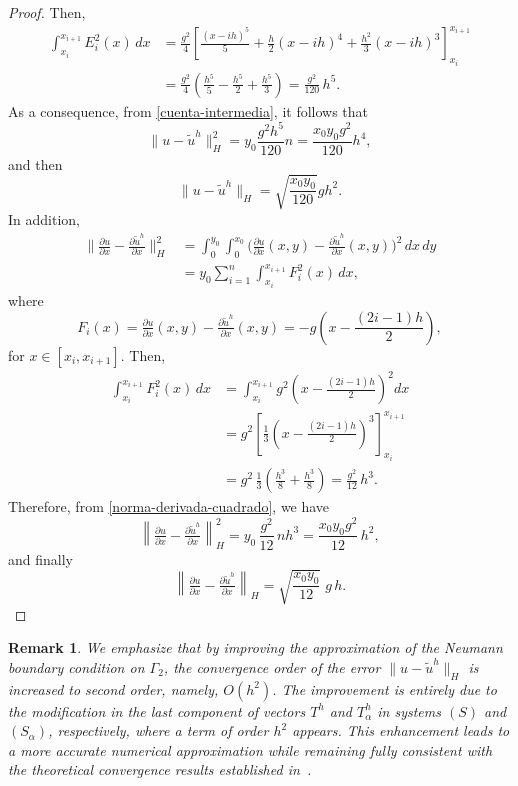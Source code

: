 \documentclass[11pt]{article}
\newcommand{\dee}{d}
\newcommand\pder[2][]{\ensuremath{\tfrac{\partial#1}{\partial#2}}}
\newtheorem{Remark}{Remark}
\begin{document}
\begin{proof}
Then,
\begin{equation}\label{integralEi}
\begin{aligned}
\int_{x_i}^{x_{i+1}} E_i^2(x)\,\dee x
&= \frac{g^2}{4}
\left[
\frac{(x-i h)^5}{5}
+ \frac{h}{2}(x-i h)^4
+ \frac{h^2}{3}(x-i h)^3
\right]_{x_i}^{x_{i+1}} \\[0.8ex]
&= \frac{g^2}{4}
\left(
\frac{h^5}{5}
- \frac{h^5}{2}
+ \frac{h^5}{3}
\right)
= \frac{g^2}{120}\,h^5 .
\end{aligned}
\end{equation}
As a consequence, from \eqref{cuenta-intermedia}, it follows that
$$\|u-{\widetilde{u}^h}\|_{H}^2=y_0 \frac{g^2 h^5}{120} n= \frac{x_0 y_0 g^2}{120} h^4,$$
and then
$$\|u-{\widetilde{u}^h}\|_{H}=\sqrt{\frac{x_0 y_0 }{120}} g h^2. $$
In addition,
\begin{equation}\label{norma-derivada-cuadrado}
\begin{aligned}
\big\|\pder[u]{x}-\pder[{\widetilde{u}^h}]{x}\big\|_{H}^{2}
&= \int_0^{y_0}\int_0^{x_0}
\big(\pder[u]{x}(x,y)-\pder[{\widetilde{u}^h}]{x}(x,y)\big)^2
\,\dee x\,\dee y \\[1ex]
&= y_0 \sum_{i=1}^n \int_{x_i}^{x_{i+1}} F_i^2(x)\,\dee x ,
\end{aligned}
\end{equation}
where
$$
F_i(x)
= \pder[u]{x}(x,y)-\pder[{\widetilde{u}^h}]{x}(x,y)
= -g\!\left(x-\frac{(2i-1)h}{2}\right),
$$
 for $x\in[x_i,x_{i+1}]$.
 Then,
 \[
\begin{aligned}
\int_{x_i}^{x_{i+1}} F_i^2(x)\,\dee x
&= \int_{x_i}^{x_{i+1}}
g^2\!\left(x-\frac{(2i-1)h}{2}\right)^2 \dee x \\[0.8ex]
&= g^2
\left[
\frac{1}{3}\left(x-\frac{(2i-1)h}{2}\right)^3
\right]_{x_i}^{x_{i+1}} \\
&= g^2\,
\frac{1}{3}\left(\frac{h^3}{8}+\frac{h^3}{8}\right)
= \frac{g^2}{12}\,h^3 .
\end{aligned}
\]
Therefore, from \eqref{norma-derivada-cuadrado}, we have
\[
\left\|\pder[u]{x}-\pder[{\widetilde{u}^h}]{x}\right\|_{H}^{2}
= y_0\,\frac{g^2}{12}\,n h^3
= \frac{x_0 y_0 g^2}{12}\,h^2 ,
\]
and finally
\[
\left\|\pder[u]{x}-\pder[{\widetilde{u}^h}]{x}\right\|_{H}
= \sqrt{\frac{x_0 y_0}{12}}\; g\, h .
\]
\end{proof}

 
 \begin{Remark}
We emphasize that by improving the approximation of the Neumann boundary condition on $\Gamma_2$, the convergence order of the error $\|u-{\widetilde{u}^h}\|_H$ is increased to second order, namely, $O(h^2)$. {The improvement is entirely due to the modification in the last component of vectors $T^h$ and $T^h_\alpha$  in systems $(S)$ and $(S_\alpha)$, respectively, where a term of order $h^2$ appears.}
This enhancement leads to a more accurate numerical approximation while remaining fully consistent with the theoretical convergence results established in~\cite{CaMa2002,Hi2005}.
\end{Remark}
\end{document}
